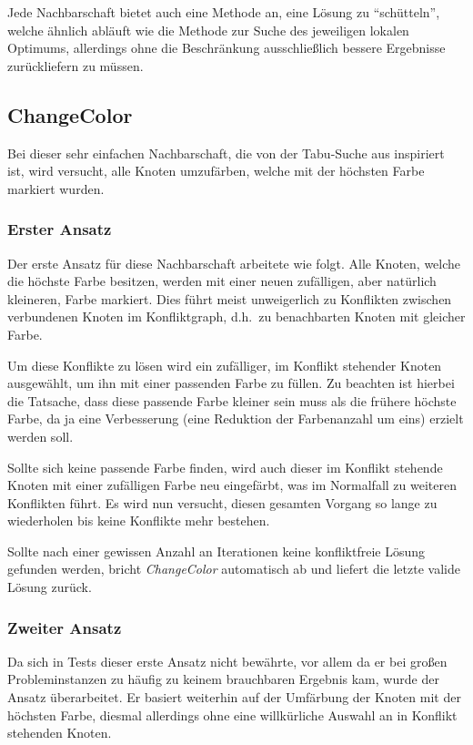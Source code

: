 Jede Nachbarschaft bietet auch eine Methode an, eine Lösung zu ``schütteln'', welche ähnlich abläuft wie die Methode zur Suche des jeweiligen lokalen Optimums, allerdings ohne die Beschränkung ausschließlich bessere Ergebnisse zurückliefern zu müssen.

\subsection{ChangeColor}
\label{sec:changecolor}
Bei dieser sehr einfachen Nachbarschaft, die von der Tabu-Suche aus \citet*{Noronha2006} inspiriert ist, wird versucht, alle Knoten umzufärben, welche mit der höchsten Farbe markiert wurden. 

\subsubsection{Erster Ansatz}
Der erste Ansatz für diese Nachbarschaft arbeitete wie folgt.
Alle Knoten, welche die höchste Farbe besitzen, werden mit einer neuen zufälligen, aber natürlich kleineren, Farbe markiert. Dies führt meist unweigerlich zu Konflikten zwischen verbundenen Knoten im Konfliktgraph, d.h.\ zu benachbarten Knoten mit gleicher Farbe. 

Um diese Konflikte zu lösen wird ein zufälliger, im Konflikt stehender Knoten ausgewählt, um ihn mit einer passenden Farbe zu füllen. Zu beachten ist hierbei die Tatsache, dass diese passende Farbe kleiner sein muss als die frühere höchste Farbe, da ja eine Verbesserung (eine Reduktion der Farbenanzahl um eins) erzielt werden soll.

Sollte sich keine passende Farbe finden, wird auch dieser im Konflikt stehende Knoten mit ei\-ner zufälligen Farbe neu eingefärbt, was im Normalfall zu weiteren Konflikten führt. Es wird nun versucht, diesen gesamten Vorgang so lange zu wiederholen bis keine Konflikte mehr bestehen. 

Sollte nach einer gewissen Anzahl an Iterationen keine konfliktfreie Lösung gefunden werden, bricht \emph{ChangeColor} automatisch ab und liefert die letzte valide Lösung zurück.

\subsubsection{Zweiter Ansatz}
Da sich in Tests dieser erste Ansatz nicht bewährte, vor allem da er bei großen Probleminstanzen zu häufig zu keinem brauchbaren Ergebnis kam, wurde der Ansatz überarbeitet. Er basiert weiterhin auf der Umfärbung der
Knoten mit der höchsten Farbe, diesmal allerdings ohne eine willkürliche Auswahl an in Konflikt stehenden Knoten.

